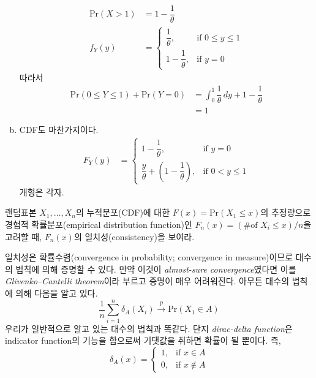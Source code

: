 \documentclass[answers]{exam}
\begin{document}
\begin{questions}
\begin{solution}
\begin{enumerate}[(a)]
\begin{align}
        \mathrm{Pr}\left(X>1\right) &= 1-\dfrac{1}{\theta}\\
        f_{Y}\left(y\right)&=\begin{cases}\dfrac{1}{\theta},&\text{if $0\leq y\leq 1$}\\ 1-\dfrac{1}{\theta},&\text{if $y=0$} \end{cases}
      \end{align}
      따라서
      \begin{align}
        \mathrm{Pr}\left(0\leq Y\leq 1\right)+\mathrm{Pr}\left(Y=0\right)&=\int_{0}^{1}\dfrac{1}{\theta}\,dy + 1-\dfrac{1}{\theta}\\
        &=1
      \end{align}
      \item CDF도 마찬가지이다.
      \begin{align}
        F_{Y}\left(y\right) &= \begin{cases}1-\dfrac{1}{\theta},&\text{if $y=0$}\\\dfrac{y}{\theta}+\left(1-\dfrac{1}{\theta}\right),&\text{if $0<y\leq 1$} \end{cases}
      \end{align}
      개형은 각자.
    \end{enumerate}
   \end{solution}
   \question
   랜덤표본 $X_{1},\ldots, X_{n}$의 누적분포(CDF)에 대한 $F\left(x\right)=\mathrm{Pr}\left(X_{1}\leq x\right)$의 추정량으로 경험적 확률분포(empirical distribution function)인 $F_{n}\left(x\right)=\left(\text{\# of $X_{i}\leq x$}\right)/n$을 고려할 때, $F_{n}\left(x\right)$의 일치성(consistency)을 보여라.
   \begin{solution}
     일치성은 확률수렴(convergence in probability; convergence in measure)이므로 대수의 법칙에 의해 증명할 수 있다. 만약 이것이 \emph{almost-sure convergence}였다면 이를 \emph{Glivenko–Cantelli theorem}이라 부르고 증명이 매우 어려워진다. 아무튼 대수의 법칙에 의해 다음을 알고 있다.
     \begin{equation}
      \dfrac{1}{n}\sum_{i=1}^{n}\delta_{A}\left(X_{i}\right)\xrightarrow{p}\mathrm{Pr}\left(X_{1}\in A\right)
     \end{equation}
     우리가 일반적으로 알고 있는 대수의 법칙과 똑같다. 단지 \emph{dirac-delta function}은 indicator function의 기능을 함으로써 기댓값을 취하면 확률이 될 뿐이다. 즉,
     \begin{equation}
      \delta_{A}\left(x\right) = \begin{cases}1, & \text{if $x\in A$}\\ 0, & \text{if $x \notin A$} \end{cases}

\end{equation}
\end{solution}
\end{questions}
\end{document}
